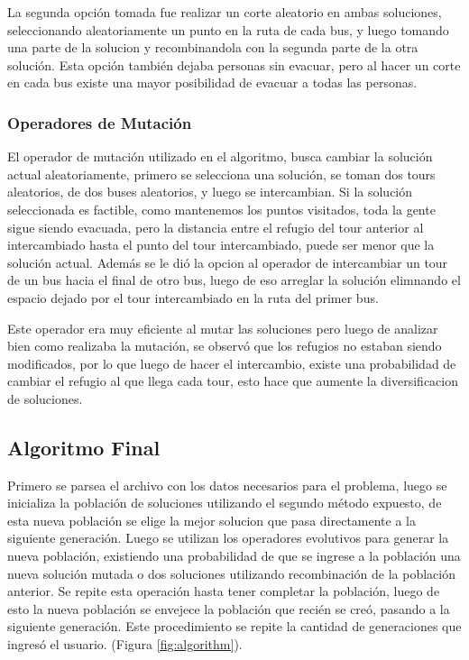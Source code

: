 \documentclass[letter, 10pt]{article}
\begin{document}
La segunda opción tomada fue realizar un corte aleatorio en ambas soluciones, seleccionando aleatoriamente un punto en la ruta de cada bus, y  luego tomando una parte de la solucion y recombinandola con la segunda parte de la otra solución. Esta opción también dejaba personas sin evacuar, pero al hacer un corte en cada bus existe una mayor posibilidad de evacuar a todas las personas.

\subsubsection{Operadores de Mutación}
El operador de mutación utilizado en el algoritmo, busca cambiar la solución actual aleatoriamente, primero se selecciona una solución, se toman dos tours aleatorios, de dos buses aleatorios, y luego se intercambian. Si la solución seleccionada es factible, como mantenemos los puntos visitados, toda la gente sigue siendo evacuada, pero la distancia entre el refugio del tour anterior al intercambiado hasta el punto del tour intercambiado, puede ser menor que la solución actual. Además se le dió la opcion al operador de intercambiar un tour de un bus hacia el final de otro bus, luego de eso arreglar la solución elimnando el espacio dejado por el tour intercambiado en la ruta del primer bus.

Este operador era muy eficiente al mutar las soluciones pero luego de analizar bien como realizaba la mutación, se observó que los refugios no estaban siendo modificados, por lo que luego de hacer el intercambio, existe una probabilidad de cambiar el refugio al que llega cada tour, esto hace que aumente la diversificacion de soluciones.

\subsection{Algoritmo Final}
Primero se parsea el archivo con los datos necesarios para el problema, luego se inicializa la población de soluciones utilizando el segundo método expuesto, de esta nueva población se elige la mejor solucion que pasa directamente a la siguiente generación. Luego se utilizan los operadores evolutivos para generar la nueva población, existiendo una probabilidad de que se ingrese a la población una nueva solución mutada o dos soluciones utilizando recombinación de la población anterior. Se repite esta operación hasta tener completar la población, luego de esto la nueva población se envejece la población que recién se creó, pasando a la siguiente generación. Este procedimiento se repite la cantidad de generaciones que ingresó el usuario. (Figura \ref{fig:algorithm}).
\end{document}
